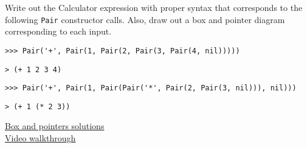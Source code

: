 \question Write out the Calculator expression with proper syntax that
corresponds to the following \texttt{Pair} constructor calls. Also,
draw out a box and pointer diagram corresponding to each input.

\begin{lstlisting}
>>> Pair('+', Pair(1, Pair(2, Pair(3, Pair(4, nil)))))
\end{lstlisting}
\begin{solution}[.6in]
\begin{lstlisting}
> (+ 1 2 3 4)
\end{lstlisting}
\end{solution}
\begin{verbatim}
>>> Pair('+', Pair(1, Pair(Pair('*', Pair(2, Pair(3, nil))), nil)))
\end{verbatim}
\begin{solution}[.7in]
\begin{lstlisting}
> (+ 1 (* 2 3))
\end{lstlisting}
\href{https://goo.gl/6VKGQX}{Box and pointers solutions}\\
\href{https://youtu.be/zIvYrA76GRo?t=1m59s}{Video walkthrough}
\end{solution}
